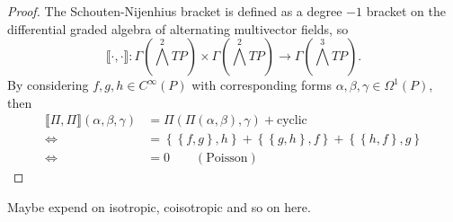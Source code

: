 % 
\begin{proof}
    The Schouten-Nijenhius bracket is defined as a degree $-1$ bracket on the differential graded algebra of alternating multivector fields, so
    \begin{equation}
        \llbracket \cdot, \cdot \rrbracket : \Gamma( \bigwedge^2 TP) \times \Gamma( \bigwedge^2 TP) \rightarrow \Gamma( \bigwedge^3 TP).
    \end{equation}
    By considering $f,g,h \in C^\infty(P)$ with corresponding forms $\alpha,\beta, \gamma \in  \Omega^1(P)$, then
    \begin{align*}
        \llbracket \Pi, \Pi\rrbracket(\alpha, \beta, \gamma) &= \Pi( \Pi(\alpha, \beta), \gamma) + \mathrm{cyclic} \\
        \Leftrightarrow \qquad \qquad  &= \left\{\left\{  f,g\right\}, h  \right\} 
        + \left\{ \left\{ g,h \right\},f \right\}
        + \left\{  \left\{ h,f \right\},g \right\} \\
        \Leftrightarrow \qquad \qquad &=0 \quad \quad \mathrm{(Poisson)}
    \end{align*}
    
\end{proof}
% 
% 
\label{def:hamiltonian_distribution}

Maybe expend on isotropic, coisotropic and so on here.

